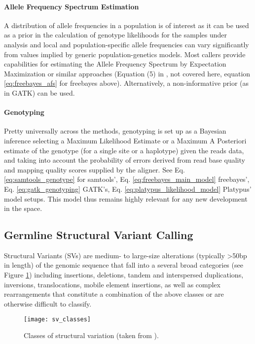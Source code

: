 \paragraph{Allele Frequency Spectrum Estimation}

A distribution of allele frequencies in a population is of interest as it can be used as a prior in the calculation of genotype likelihoods for the samples under analysis and local and population-specific allele frequencies can vary significantly from values implied by generic population-genetics models. Most callers provide capabilities for estimating the Allele Frequency Spectrum by Expectation Maximization or similar approaches (Equation (5) in \autocite{li2011statistical}, not covered here, equation \ref{eq:freebayes_afs} for freebayes above). Alternatively, a non-informative prior (as in GATK) can be used.

\paragraph{Genotyping}

Pretty universally across the methods, genotyping is set up as a Bayesian inference selecting a Maximum Likelihood Estimate or a Maximum A Posteriori estimate of the genotype (for a single site or a haplotype) given the reads data, and taking into account the probability of errors derived from read base quality and mapping quality scores supplied by the aligner. See Eq. \ref{eq:samtools_genotype} for samtools', Eq. \ref{eq:freebayes_main_model} freebayes', Eq. \ref{eq:gatk_genotyping} GATK's, Eq. \ref{eq:platypus_likelihood_model} Platypus' model setups. This model thus remains highly relevant for any new development in the space. 

\subsection{Germline Structural Variant Calling}
\label{sec:bg_germline_sv_calling}

Structural Variants (SVs) are medium- to large-size alterations (typically >50bp in length) of the genomic sequence that fall into a several broad categories (see Figure \ref{fig:sv_classes}) including insertions, deletions, tandem and interspersed duplications, inversions, translocations, mobile element insertions, as well as complex rearrangements that constitute a combination of the above classes or are otherwise difficult to classify. 

\begin{figure}[H]
    \texttt{[image: sv\_classes]}
    \centering
    \caption {Classes of structural variation (taken from \autocite{alkan2011genome}).}
    \label{fig:sv_classes}
\end{figure}


